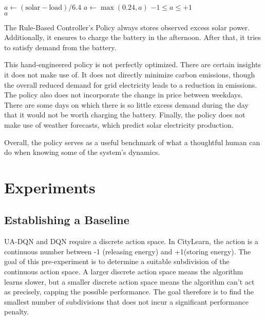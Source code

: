 \begin{algorithm}[h]
    \begin{algorithmic}
        \State $a \gets (\text{solar} - \text{load})/6.4$ 
            \State $a \gets \max(0.24, a)$ 
        \EndIf
        \Ensure $-1 \leq a \leq +1$ \\
        \Return $a$
    \end{algorithmic}
    \caption{The Rule-Based Controller's Policy always stores observed excess solar power. Additionally, it ensures to charge the battery in the afternoon. After that, it tries to satisfy demand from the battery.}
    \label{alg:rbc}
\end{algorithm}

This hand-engineered policy is not perfectly optimized.
There are certain insights it does not make use of.
It does not directly minimize carbon emissions, though the overall reduced demand for grid electricity leads to a reduction in emissions.
The policy also does not incorporate the change in price between weekdays.
There are some days on which there is so little excess demand during the day that it would not be worth charging the battery.
Finally, the policy does not make use of weather forecasts, which predict solar electricity production.

Overall, the policy serves as a useful benchmark of what a thoughtful human can do when knowing some of the system's dynamics.


\section{Experiments} %

\subsection{Establishing a Baseline} \label{sec:discretization}
UA-DQN and DQN require a discrete action space.
In CityLearn, the action is a continuous number between -1 (releasing energy) and +1(storing energy).
The goal of this pre-experiment is to determine a suitable subdivision of the continuous action space.
A larger discrete action space means the algorithm learns slower, but a smaller discrete action space means the algorithm can't act as precisely, capping the possible performance.
The goal therefore is to find the smallest number of subdivisions that does not incur a significant performance penalty.

